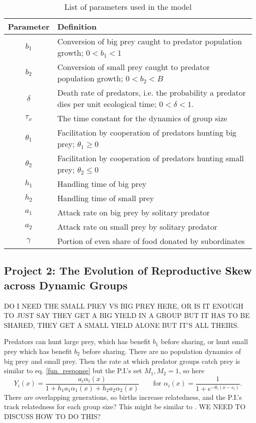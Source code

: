 \begin{table}[htp!]
\caption{List of parameters used in the model}
\begin{center}
\begin{tabular}{|c|p{5in}|}
\hline
\textbf{Parameter} & \textbf{Definition}  \\
\hline
$b_1$ & Conversion of big prey caught to predator population growth; $0 < b_1 < 1$ \\
\hline
$b_2$ & Conversion of small prey caught to predator population growth; $0 < b_2 < B$ \\
\hline
$\delta$ & Death rate of predators, i.e. the probability a predator dies per unit ecological time; $0 < \delta < 1$.\\
\hline
$\tau_x$ & The time constant for the dynamics of group size \\
\hline
$\theta_1$ & Facilitation by cooperation of predators hunting big prey; $\theta_1 \geq 0$ \\
\hline
$\theta_2$ & Facilitation by cooperation of predators hunting small prey; $\theta_2 \leq 0$ \\
\hline
$h_1$ & Handling time of big prey \\
\hline
$h_2$ & Handling time of small prey \\
\hline
$a_1$ & Attack rate on big prey by solitary predator \\
\hline
$a_2$ & Attack rate on small prey by solitary predator \\
\hline
$\gamma$ & Portion of even share of food donated by subordinates \\
\hline
\end{tabular}
\end{center}
\label{originalparameters}
\end{table}%

\subsection{Project 2: The Evolution of Reproductive Skew across Dynamic Groups}

DO I NEED THE SMALL PREY VS BIG PREY HERE, OR IS IT ENOUGH TO JUST SAY THEY GET A BIG YIELD IN A GROUP BUT IT HAS TO BE SHARED, THEY GET A SMALL YIELD ALONE BUT IT'S ALL THEIRS.

Predators can hunt large prey, which has benefit $b_1$ before sharing, or hunt small prey which has benefit $b_2$ before sharing. There are no population dynamics of big prey and small prey. Then the rate at which predator groups catch prey is similar to eq. \ref{fun_response} but the P.I.'s set $M_1, M_2 = 1$, so here
\begin{equation} \label{fun_response_2}
Y_i(x) = \frac{a_i \alpha_i(x)}{1 + h_1 a_1 \alpha_1(x) + h_2 a_2 \alpha_2(x)} \qquad \text{for }
\alpha_i(x) = \frac{1}{1 + e^{-\theta_i(x - s_i)}}.
\end{equation}
There are overlapping generations, so births increase relatedness, and the P.I.'s track relatedness for each group size? This might be similar to \cite{johnstone_kin_2008}. WE NEED TO DISCUSS HOW TO DO THIS?

